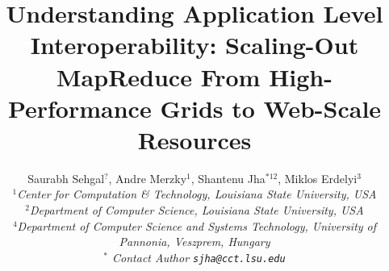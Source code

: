 \documentclass[3p,twocolumn]{elsarticle}
\begin{document}
\title{Understanding Application Level Interoperability: Scaling-Out
  MapReduce From High-Performance Grids to Web-Scale Resources}
\author{Saurabh Sehgal$^?$, Andre Merzky$^{1}$, Shantenu Jha$^{*12}$,  Miklos Erdelyi$^3$ \\
\small{\emph{$^{1}$Center for Computation \& Technology, Louisiana State University, USA}}\\
\small{\emph{$^{2}$Department of Computer Science, Louisiana State University, USA}}\\
\small{\emph{$^{4}$Department of Computer Science and Systems Technology, University of
    Pannonia, Veszprem, Hungary}}\\
\small{\emph{$^{*}$ Contact Author \texttt{sjha@cct.lsu.edu}}}}

\newif\ifdraft
\drafttrue
\ifdraft
\newcommand{\amnote}[1]{ {\textcolor{magenta} { ***AM: #1c }}}
\newcommand{\jhanote}[1]{ {\textcolor{red} { ***SJ: #1 }}}
\newcommand{\miklosnote}[1]{ {\textcolor{blue} { ***ME: #1 }}}
\newcommand{\ssnote}[1]{ {\textcolor{blue} { ***SS: #1 }}}
\else
\newcommand{\amnote}[1]{}
\newcommand{\jhanote}[1]{}
\newcommand{\miklosnote}[1]{}
\newcommand{\ssnote}[1]{}
\fi

\newcommand{\sagamapreduce }{SAGA-MapReduce }
\newcommand{\tc }{ $T_c$ }

\newcommand{\upup}{\vspace*{-0.6em}}
\newcommand{\upp}{\vspace*{-0.6em}}
\newcommand{\up}{\vspace*{-0.3em}}

\newcommand{\T}[1]{\texttt{#1}}
\newcommand{\I}[1]{\textit{#1}}
\newcommand{\B}[1]{\textbf{#1}}

\newcommand{\ssh}[1]{\texttt{ssh}}
\newcommand{\scp}[1]{\texttt{scp}}
\newcommand{\sshfs}[1]{\texttt{sshfs}}
 
\end{document}
